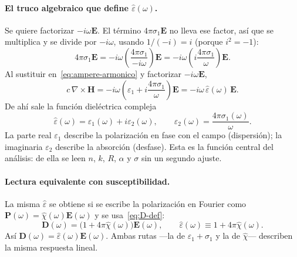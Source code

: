 \paragraph{El truco algebraico que define $\hat\varepsilon(\omega)$.}
Se quiere factorizar $-i\omega\mathbf{E}$.
El t\'ermino $4\pi\sigma_1\mathbf{E}$ no lleva ese factor, as\'i que se multiplica y se divide por $-i\omega$,
usando $1/(-i)=i$ (porque $i^{2}=-1$):
\begin{equation}
4\pi\sigma_1\mathbf{E}
=-i\omega\left(\frac{4\pi\sigma_1}{-i\omega}\right)\mathbf{E}
=-i\omega\left(i\frac{4\pi\sigma_1}{\omega}\right)\mathbf{E}.
\end{equation}
Al sustituir en~\eqref{eq:ampere-armonico} y factorizar $-i\omega\mathbf{E}$,
\begin{equation}
\label{eq:ampere-eps-hat}
c\,\nabla\times\mathbf{H}
=-i\omega\left(\varepsilon_1+i\frac{4\pi\sigma_1}{\omega}\right)\mathbf{E}
=-i\omega\,\hat\varepsilon(\omega)\,\mathbf{E}.
\end{equation}
De ah\'i sale la funci\'on diel\'ectrica compleja
\begin{equation}
\label{eq:eps-def}
\hat\varepsilon(\omega)
=\varepsilon_1(\omega)+i\varepsilon_2(\omega),
\qquad
\varepsilon_2(\omega)=\frac{4\pi\sigma_1(\omega)}{\omega}.
\end{equation}
La parte real $\varepsilon_1$ describe la polarizaci\'on en fase con el campo (dispersi\'on);
la imaginaria $\varepsilon_2$ describe la absorci\'on (desfase).
Esta es la funci\'on central del an\'alisis: de ella se leen $n$, $k$, $R$, $\alpha$ y $\sigma$ sin un segundo ajuste.

\paragraph{Lectura equivalente con susceptibilidad.}
La misma $\hat\varepsilon$ se obtiene si se escribe la polarizaci\'on en Fourier como
$\mathbf{P}(\omega)=\hat\chi(\omega)\mathbf{E}(\omega)$ y se usa~\eqref{eq:D-def}:
\begin{equation}
\mathbf{D}(\omega)=\bigl(1+4\pi\hat\chi(\omega)\bigr)\mathbf{E}(\omega),
\qquad
\hat\varepsilon(\omega)\equiv 1+4\pi\hat\chi(\omega).
\end{equation}
As\'i $\mathbf{D}(\omega)=\hat\varepsilon(\omega)\mathbf{E}(\omega)$.
Ambas rutas ---la de $\varepsilon_1+\sigma_1$ y la de $\hat\chi$--- describen la misma respuesta lineal.

